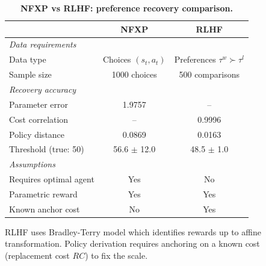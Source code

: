 \begin{table}[htbp]
\centering
\caption[NFXP vs RLHF: preference recovery comparison]{\textbf{NFXP vs RLHF: preference recovery comparison.}}
\label{tab:nfxp_rlhf}
\begin{tabular}{lcc}
\toprule
& NFXP & RLHF \\
\midrule
\multicolumn{3}{l}{\emph{Data requirements}} \\
Data type & Choices $(s_t, a_t)$ & Preferences $\tau^w \succ \tau^l$ \\
Sample size & 1000 choices & 500 comparisons \\
\midrule
\multicolumn{3}{l}{\emph{Recovery accuracy}} \\
Parameter error & 1.9757 & -- \\
Cost correlation & -- & 0.9996 \\
Policy distance & 0.0869 & 0.0163 \\
Threshold (true: 50) & 56.6 $\pm$ 12.0 & 48.5 $\pm$ 1.0 \\
\midrule
\multicolumn{3}{l}{\emph{Assumptions}} \\
Requires optimal agent & Yes & No \\
Parametric reward & Yes & Yes \\
Known anchor cost & No & Yes \\
\bottomrule
\end{tabular}
\begin{tablenotes}
\small
\item RLHF uses Bradley-Terry model which identifies rewards up to affine transformation.
Policy derivation requires anchoring on a known cost (replacement cost $RC$) to fix the scale.
\end{tablenotes}
\end{table}
